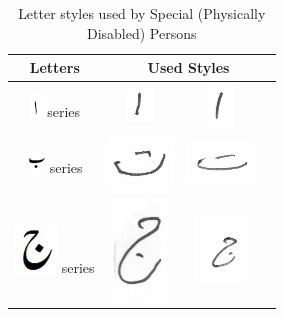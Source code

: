\documentclass[a4paper,conference]{IEEEtran}
\begin{document}
\begin{table}[h]
\centering
\caption{Letter styles used by Special (Physically Disabled) Persons}\label{tab6-pdp}
\begin{tabular}{@{}cccc@{}}
\hline
Letters	& \multicolumn{3}{c}{\textbf{Used Styles}} \\ \hline
\includegraphics[scale=0.50]{alif.png} series & \includegraphics[scale=0.25]{119} & \includegraphics[scale=0.25]{120}  &   \\ 
\hline
\includegraphics[scale=0.50]{bay} series & \includegraphics[scale=0.20]{121} & \includegraphics[scale=0.20]{122}  &  \\
\hline
\includegraphics[scale=0.25]{jeeem} series & \includegraphics[scale=0.20]{123} & \includegraphics[scale=0.20]{124}  &  \\

\end{tabular}
\end{table}
\end{document}
